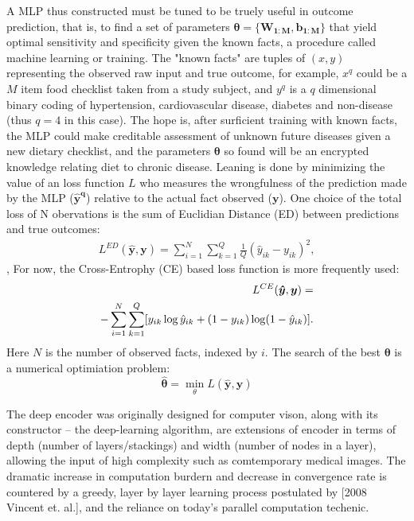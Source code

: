 \documentclass[twocolumn]{article}
\begin{document}
A MLP thus constructed must be tuned to be truely useful in outcome prediction, that is, to find a set of parameters $\boldsymbol{\theta}=\{\boldsymbol{W_{1:M}},\boldsymbol{b_{1:M}}\}$ that yield optimal sensitivity and specificity given the known facts, a procedure called machine learning or training. The "known facts" are tuples of $(x, y)$ representing the observed raw input and true outcome, for example, $x^q$ could be a $M$ item food checklist taken from a study subject, and $y^q$ is a $q$ dimensional binary coding of hypertension, cardiovascular disease, diabetes and non-disease (thus $q=4$ in this case). The hope is, after surficient training with known facts, the MLP could make creditable assessment of unknown future diseases given a new dietary checklist, and the parameters $\boldsymbol{\theta}$ so found will be an encrypted knowledge relating diet to chronic disease. Leaning is done by minimizing the value of an loss function $L$ who measures the wrongfulness of the prediction made by the MLP ($\boldsymbol{\hat{y}^q}$) relative to the actual fact observed ($\boldsymbol{y}$). 
One choice of the total loss of N obervations is the sum of Euclidian Distance (ED) between predictions and true outcomes:
\begin{equation*} \label{eq_lEC}
\begin{split}
  L^{ED}(\boldsymbol{\hat{y}},\boldsymbol{y}) = \sum_{i=1}^N\sum_{k=1}^Q\frac{1}{Q}(\hat{y}_{ik}-y_{ik})^2,
\end{split}
\end{equation*},
For now, the Cross-Entrophy (CE) based loss function is more frequently used:
\begin{equation*} \label{eq_lEC}
\begin{split}
\noindent L^{CE}(\boldsymbol{\hat{y}},\boldsymbol{y}) = \\
  -\sum_{i=1}^N\sum_{k=1}^Q[y_{ik}\log{\hat{y}_{ik}}+(1-y_{ik})\log(1-\hat{y}_{ik})]. \\
\end{split}
\end{equation*}
Here $N$ is the number of observed facts, indexed by $i$. The search of the best $\boldsymbol{\theta}$ is a numerical optimiation problem:
\[\boldsymbol{\hat{\theta}}=\min_{\theta}L(\boldsymbol{\hat{y}},\boldsymbol{y})\]

The deep encoder was originally designed for computer vison, along with its constructor -- the deep-learning algorithm, are extensions of encoder in terms of depth (number of layers/stackings) and width (number of nodes in a layer), allowing the input of high complexity such as comtemporary medical images. The dramatic increase in computation burdern and decrease in convergence rate is countered by a greedy, layer by layer learning process postulated by [2008 Vincent et. al.], and the reliance on today's parallel computation techenic.
\end{document}
